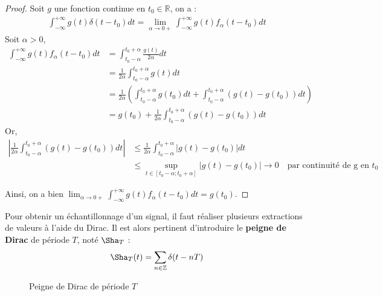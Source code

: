 \begin{proof}
    \vspace{0.2cm}
    
    Soit $g$ une fonction continue en $t_0 \in \mathbb{R}$, on a :
    \begin{align*}
        \int_{-\infty}^{+\infty} g(t) \delta(t - t_0) dt = \lim_{\alpha \to 0+} \int_{-\infty}^{+\infty} g(t) f_{\alpha}(t - t_0) dt
    \end{align*}
    Soit $\alpha > 0$,
    \begin{align*}
        \int_{-\infty}^{+\infty} g(t) f_{\alpha}(t - t_0) dt &= \int_{t_0 - \alpha}^{t_0 + \alpha} \frac{g(t)}{2\alpha} dt \\
        &= \frac{1}{2 \alpha} \int_{t_0 - \alpha}^{t_0 + \alpha} g(t) dt \\
        &= \frac{1}{2 \alpha} \left( \int_{t_0 - \alpha}^{t_0 + \alpha} g(t_0) dt + \int_{t_0 - \alpha}^{t_0 + \alpha} \left( g(t) - g(t_0) \right) dt \right) \\
        &= g(t_0) + \frac{1}{2 \alpha} \int_{t_0 - \alpha}^{t_0 + \alpha} \left( g(t) - g(t_0) \right) dt
    \end{align*}
    Or, 
    \begin{align*}
        \left| \frac{1}{2 \alpha} \int_{t_0 - \alpha}^{t_0 + \alpha} \left( g(t) - g(t_0) \right) dt \right| &\leq \frac{1}{2 \alpha} \int_{t_0 - \alpha}^{t_0 + \alpha} \left| g(t) - g(t_0) \right| dt \\
        &\leq \sup_{t \in \left[ t_0 - \alpha ; t_0 + \alpha \right]} \left| g(t) - g(t_0) \right| \to 0 \quad \text{par continuité de g en $t_0$}
    \end{align*}

    Ainsi, on a bien $\lim_{\alpha \to 0+} \int_{-\infty}^{+\infty} g(t) f_{\alpha}(t - t_0) dt = g(t_0)$.

\end{proof}

Pour obtenir un échantillonnage d'un signal, il faut réaliser plusieurs extractions de valeurs à l'aide du Dirac. Il est alors pertinent d'introduire le \textbf{peigne de Dirac} de période $T$, noté $\Sha_{T}$ :
\begin{align*}
    \Sha_{T}(t) = \sum_{n\in\mathbb{Z}} \delta(t - nT)
\end{align*}

\begin{figure}[H]
    \begin{center}
    \caption{Peigne de Dirac de période $T$}
    \end{center}
\end{figure}

